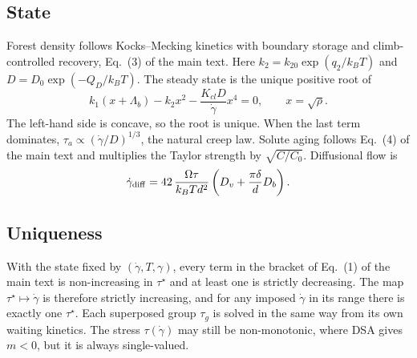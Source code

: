 \documentclass[aps,prl,onecolumn,superscriptaddress,amsmath,amssymb,floatfix]{revtex4-2}
\newcommand{\gd}{\dot\gamma}
\newcommand{\ts}{\tau^{\star}}
\newcommand{\kT}{k_BT}
\begin{document}
\subsection{State}
Forest density follows Kocks--Mecking kinetics with boundary storage and climb-controlled recovery, Eq.~(3) of the main text. Here $k_2=k_{20}\exp(q_2/\kT)$ and $D=D_0\exp(-Q_D/\kT)$. The steady state is the unique positive root of
\begin{equation}
k_1(x+\Lambda_b)-k_2x^2-\frac{K_{cl}D}{\gd}x^4=0,\qquad x=\sqrt\rho .
\end{equation}
The left-hand side is concave, so the root is unique. When the last term dominates, $\tau_a\propto(\gd/D)^{1/3}$, the natural creep law. Solute aging follows Eq.~(4) of the main text and multiplies the Taylor strength by $\sqrt{C/C_0}$. Diffusional flow is
\begin{equation}
\gd_{\rm diff}=42\,\frac{\Omega\tau}{\kT d^2}\left(D_v+\frac{\pi\delta}{d}D_b\right).
\end{equation}

\subsection{Uniqueness}
With the state fixed by $(\gd,T,\gamma)$, every term in the bracket of Eq.~(1) of the main text is non-increasing in $\ts$ and at least one is strictly decreasing. The map $\ts\mapsto\gd$ is therefore strictly increasing, and for any imposed $\gd$ in its range there is exactly one $\ts$. Each superposed group $\tau_g$ is solved in the same way from its own waiting kinetics. The stress $\tau(\gd)$ may still be non-monotonic, where DSA gives $m<0$, but it is always single-valued.
\end{document}
